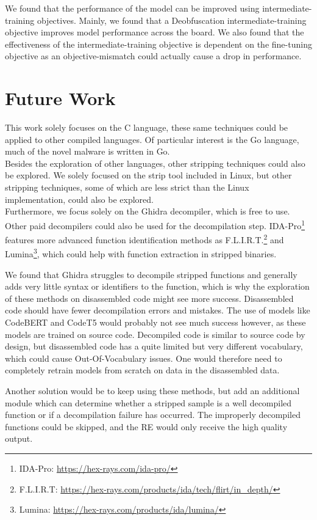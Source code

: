 We found that the performance of the model can be improved using intermediate-training objectives. Mainly, we found that a Deobfuscation intermediate-training objective improves model performance across the board. We also found that the effectiveness of the intermediate-training objective is dependent on the fine-tuning objective as an objective-mismatch could actually cause a drop in performance.

\section{Future Work}
This work solely focuses on the C language, these same techniques could be applied to other compiled languages. Of particular interest is the Go language, much of the novel malware is written in Go.\\
Besides the exploration of other languages, other stripping techniques could also be explored. We solely focused on the strip tool included in Linux, but other stripping techniques, some of which are less strict than the Linux implementation, could also be explored.\\

Furthermore, we focus solely on the Ghidra decompiler, which is free to use. Other paid decompilers could also be used for the decompilation step. IDA-Pro\footnote{IDA-Pro: \url{https://hex-rays.com/ida-pro/}} features more advanced function identification methods as F.L.I.R.T.\footnote{F.L.I.R.T: \url{https://hex-rays.com/products/ida/tech/flirt/in_depth/}} and Lumina\footnote{Lumina: \url{https://hex-rays.com/products/ida/lumina/}}, which could help with function extraction in stripped binaries.

We found that Ghidra struggles to decompile stripped functions and generally adds very little syntax or identifiers to the function, which is why the exploration of these methods on disassembled code might see more success. Disassembled code should have fewer decompilation errors and mistakes. The use of models like CodeBERT and CodeT5 would probably not see much success however, as these models are trained on source code. Decompiled code is similar to source code by design, but disassembled code has a quite limited but very different vocabulary, which could cause Out-Of-Vocabulary issues. One would therefore need to completely retrain models from scratch on data in the disassembled data.

Another solution would be to keep using these methods, but add an additional module which can determine whether a stripped sample is a well decompiled function or if a decompilation failure has occurred. The improperly decompiled functions could be skipped, and the RE would only receive the high quality output.

